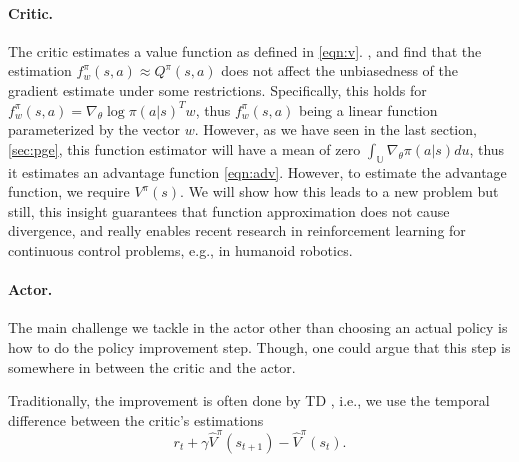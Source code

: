 \paragraph{Critic.} The critic estimates a value function as defined in \eqref{eqn:v}. \cite{Sutton:1999:PGM:3009657.3009806}, and \cite{Konda:2003:AA:942271.942292} find that the estimation $f_w^\pi(s,a) \approx Q^\pi(s,a)$ does not affect the unbiasedness of the gradient estimate under some restrictions. Specifically, this holds for $f_w^\pi(s,a) = {\nabla_\theta \log\pi(a|s)}^T w$, thus $f_w^\pi(s,a)$ being a linear function parameterized by the vector $w$. However, as we have seen in the last section, \ref{sec:pge}, this function estimator will have a mean of zero $\int_\mathbb{U} \nabla_\theta \pi(a|s)du $, thus it estimates an advantage function \ref{eqn:adv}. However, to estimate the advantage function, we require $V^\pi(s)$. We will show how this leads to a new problem but still, this insight guarantees that function approximation does not cause divergence, and really enables recent research in reinforcement learning for continuous control problems, e.g., in humanoid robotics.

\paragraph{Actor.} The main challenge we tackle in the actor other than choosing an actual policy is how to do the policy improvement step. Though, one could argue that this step is somewhere in between the critic and the actor. 

Traditionally, the improvement is often done by TD \cite{Sutton1988}, i.e., we use the temporal difference between the critic's estimations 
\begin{equation}
  r_t + \gamma \hat{V}^\pi(s_{t+1}) - \hat{V}^\pi(s_t).
\end{equation}

